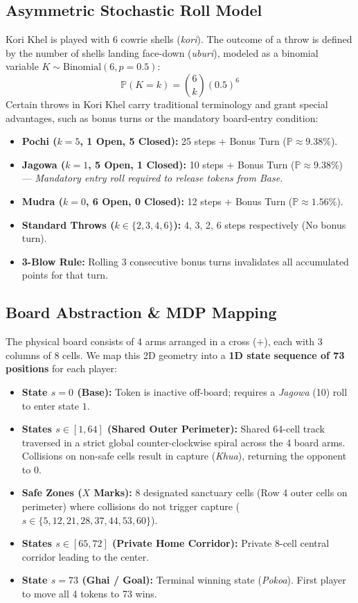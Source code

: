 \documentclass[10pt,twocolumn,a4paper]{article}
\begin{document}
\subsection{Asymmetric Stochastic Roll Model}
Kori Khel is played with 6 cowrie shells (\textit{kori}). The outcome of a throw is defined by the number of shells landing face-down (\textit{uburi}), modeled as a binomial variable $K \sim \text{Binomial}(6, p=0.5)$:
\begin{equation}
\mathbb{P}(K = k) = \binom{6}{k} (0.5)^6
\end{equation}
Certain throws in Kori Khel carry traditional terminology and grant special advantages, such as bonus turns or the mandatory board-entry condition:
\begin{itemize}[leftmargin=*,noitemsep,topsep=1pt]
    \item \textbf{Pochi ($k=5$, 1 Open, 5 Closed):} 25 steps + Bonus Turn ($\mathbb{P} \approx 9.38\%$).
    \item \textbf{Jagowa ($k=1$, 5 Open, 1 Closed):} 10 steps + Bonus Turn ($\mathbb{P} \approx 9.38\%$) --- \textit{Mandatory entry roll required to release tokens from Base.}
    \item \textbf{Mudra ($k=0$, 6 Open, 0 Closed):} 12 steps + Bonus Turn ($\mathbb{P} \approx 1.56\%$).
    \item \textbf{Standard Throws ($k \in \{2, 3, 4, 6\}$):} 4, 3, 2, 6 steps respectively (No bonus turn).
    \item \textbf{3-Blow Rule:} Rolling 3 consecutive bonus turns invalidates all accumulated points for that turn.
\end{itemize}

\subsection{Board Abstraction \& MDP Mapping}
The physical board consists of 4 arms arranged in a cross ($+$), each with 3 columns of 8 cells. We map this 2D geometry into a \textbf{1D state sequence of 73 positions} for each player:
\begin{itemize}[leftmargin=*,noitemsep,topsep=1pt]
    \item \textbf{State $s = 0$ (Base):} Token is inactive off-board; requires a \textit{Jagowa} (10) roll to enter state $1$.
    \item \textbf{States $s \in [1, 64]$ (Shared Outer Perimeter):} Shared 64-cell track traversed in a strict global counter-clockwise spiral across the 4 board arms. Collisions on non-safe cells result in capture (\textit{Khua}), returning the opponent to $0$.
    \item \textbf{Safe Zones ($X$ Marks):} 8 designated sanctuary cells (Row 4 outer cells on perimeter) where collisions do not trigger capture ($s \in \{5, 12, 21, 28, 37, 44, 53, 60\}$).
    \item \textbf{States $s \in [65, 72]$ (Private Home Corridor):} Private 8-cell central corridor leading to the center.
    \item \textbf{State $s = 73$ (Ghai / Goal):} Terminal winning state (\textit{Pokoa}). First player to move all 4 tokens to 73 wins.
\end{itemize}
\end{document}
